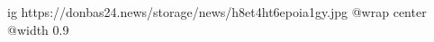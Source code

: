  
 
 
 
 

\ifcmt
  ig https://donbas24.news/storage/news/h8et4ht6epoia1gy.jpg
  @wrap center
  @width 0.9
\fi

